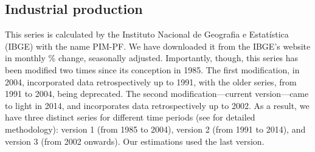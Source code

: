 \subsection{Industrial production}
This series is calculated by the Instituto Nacional de Geografia e Estatística (IBGE) with the name PIM-PF. We have downloaded it from the IBGE's website in monthly \% change, seasonally adjusted. Importantly, though, this series has been modified two times since its conception in 1985. The first modification, in 2004, incorporated data retrospectively up to 1991, with the older series, from 1991 to 2004, being deprecated. The second modification---current version---came to light in 2014, and incorporates data retrospectively up to 2002. As a result, we have three distinct series for different time periods (see \citet{IBGE2015} for detailed methodology): version 1 (from 1985 to 2004), version 2 (from 1991 to 2014), and version 3 (from 2002 onwards). Our estimations used the last version.